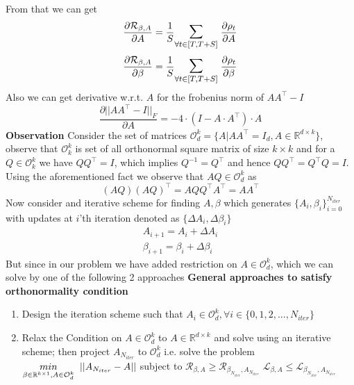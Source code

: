 \newline From that we can get
\begin{equation}
    \frac{\partial \mathcal{R}_{\beta, A}}{\partial A} = \frac{1}{S} \mathlarger{\mathlarger{\sum}}_{\forall t\in [T,T+S]} \hspace{1mm} \frac{\partial \rho_t}{\partial A} 
\end{equation}
\begin{equation}
    \frac{\partial \mathcal{R}_{\beta, A}}{\partial \beta} = \frac{1}{S} \mathlarger{\mathlarger{\sum}}_{\forall t\in [T,T+S]} \hspace{1mm} \frac{\partial \rho_t}{\partial \beta} 
\end{equation}
\newline Also we can get derivative w.r.t. $A$ for the frobenius norm of $AA^\top-I$
\begin{equation} \label{eq:derivative_forb_norm_ofAAtmI}
    \frac{\partial ||AA^\top-I||_F}{\partial A} = -4\cdot (I-A\cdot A^\top )\cdot A
\end{equation}
\textbf{Observation}\newline 
Consider the set of matrices $\mathcal{O}_d^k = \{ A | AA^\top = I_d, A \in \mathbb{R}^{d\times k} \}$, observe that $\mathcal{O}_k^k$ is set of all orthonormal square matrix of size $k\times k$ and for a $Q\in \mathcal{O}_k^k$ we have $QQ^\top = I$, which implies $Q^{-1}= Q^\top$ and hence $QQ^\top = Q^\top Q = I$. Using the aforementioned fact we observe that $AQ\in \mathcal{O}_d^k$ as
\begin{equation} \label{observation:ortho-closure_odk}
    (AQ)(AQ)^\top = AQQ^\top A^\top = AA^\top 
\end{equation}
Now consider and iterative scheme for finding $A, \beta$ which generates $\{A_i, \beta_i\}_{i=0}^{N_{iter}}$ with updates at $i$'th iteration denoted as $\{\Delta A_i, \Delta \beta_i\}$
\begin{equation}
\begin{aligned}
    A_{i+1} = A_i + \Delta A_i \\
    \beta_{i+1} = \beta_i + \Delta \beta_i
\end{aligned}
\end{equation}
But since in our problem we have added restriction on $A \in \mathcal{O}_d^k$, which we can solve by one of the following 2 approaches 
\newline \newline \textbf{General approaches to satisfy orthonormality condition}
\begin{enumerate}
    \item Design the iteration scheme such that $A_i \in \mathcal{O}_d^k, \forall i \in \{0,1,2,...,N_{iter}\}$
    \item Relax the Condition on $A \in \mathcal{O}_d^k$ to $A \in \mathbb{R}^{d\times k}$ and solve using an iterative scheme;  then project $A_{N_{iter}}$ to $\mathcal{O}_d^k$ i.e. solve the problem $\underset{\beta \in \mathbb{R}^{k \times 1}, A \in \mathcal{O}_d^k}{min} \hspace{2mm} ||A_{N_{iter}}-A||$ subject to $\mathcal{R}_{\beta, A} \ge \mathcal{R}_{\beta_{N_{iter}}, A_{N_{iter}}}$ $\mathcal{L}_{\beta, A} \le \mathcal{L}_{\beta_{N_{iter}}, A_{N_{iter}}}$
\end{enumerate}
